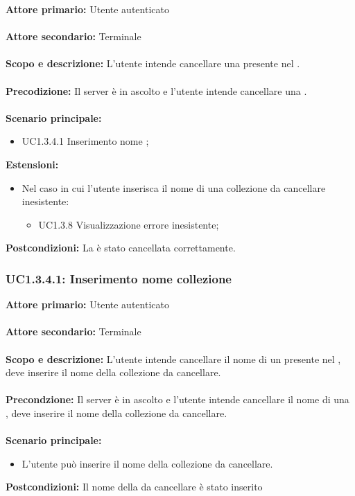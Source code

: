 \documentclass{scalatekids-article}
\begin{document}
\textbf{Attore primario:} Utente autenticato\\ \\
\textbf{Attore secondario:} Terminale\\ \\
\textbf{Scopo e descrizione:} L’utente intende cancellare una  presente nel .\\ \\
\textbf{Precodizione:} Il server è in ascolto e l’utente intende cancellare una .\\ \\
\textbf{Scenario principale:}
\begin{itemize}
\item UC1.3.4.1 Inserimento nome ;
\end{itemize}
\textbf{Estensioni:}
\begin{itemize}
\item Nel caso in cui l'utente inserisca il nome di una collezione da cancellare inesistente:
  \begin{itemize}
  \item UC1.3.8 Visualizzazione errore  inesistente;
  \end{itemize}
\end{itemize}
\textbf{Postcondizioni:} La  è stato cancellata correttamente.

\subsubsection{UC1.3.4.1: Inserimento nome collezione}

\textbf{Attore primario:} Utente autenticato\\ \\
\textbf{Attore secondario:} Terminale\\ \\
\textbf{Scopo e descrizione:} L'utente intende cancellare il nome di un  presente nel , deve inserire il nome della collezione da cancellare.\\ \\
\textbf{Precondzione:} Il server è in ascolto e l'utente intende cancellare il nome di una , deve inserire il nome della collezione da cancellare.\\ \\
\textbf{Scenario principale:}
\begin{itemize}
\item L'utente può inserire il nome della collezione da cancellare.
\end{itemize}
\textbf{Postcondizioni:} Il nome della  da cancellare è stato inserito
\end{document}
